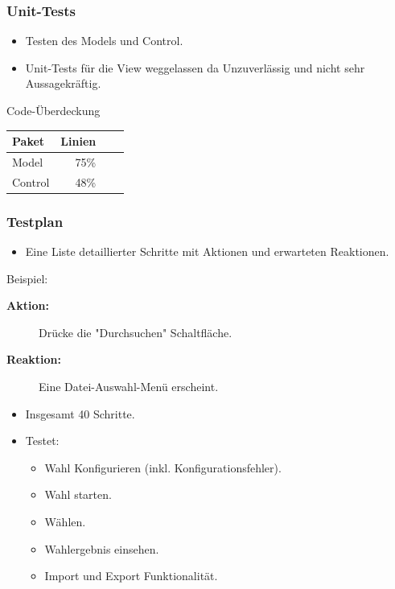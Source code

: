 \documentclass{beamer}
\begin{document}
\begin{frame}
\frametitle{Unit-Tests}
	\begin{itemize}
		\item Testen des Models und Control.
		\item Unit-Tests für die View weggelassen da Unzuverlässig und nicht sehr Aussagekräftig.
	\end{itemize}

	\pause
	\begin{block}{Code-Überdeckung}
		\begin{table}
			\begin{tabular}{l r r r}
				Paket & Linien \\
				\hline
				Model & 75\% \\
				Control & 48\% \\
			\end{tabular}
		\end{table}
	\end{block}
\end{frame}

\begin{frame}
\frametitle{Testplan}
	\begin{itemize}
		\item Eine Liste detaillierter Schritte mit Aktionen und erwarteten Reaktionen. \\
	\end{itemize}

	\begin{block}{Beispiel:}
		\begin{description}
			\item[\textbf{Aktion:}] Drücke die "Durchsuchen" Schaltfläche.
			\item[\textbf{Reaktion:}] Eine Datei-Auswahl-Menü erscheint.
		\end{description}
	\end{block}
	\begin{itemize}
		\item Insgesamt 40 Schritte.
		\item Testet:
		\begin{itemize}
			\item Wahl Konfigurieren (inkl. Konfigurationsfehler).
			\item Wahl starten.
			\item Wählen.
			\item Wahlergebnis einsehen.
			\item Import und Export Funktionalität.
		\end{itemize}
	\end{itemize}
\end{frame}
\end{document}
